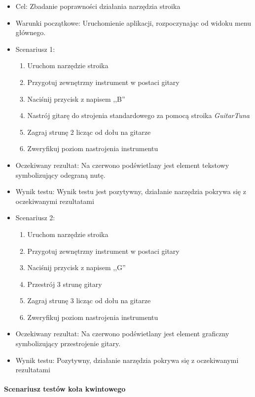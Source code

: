 \begin{itemize}
    \item Cel: Zbadanie poprawności działania narzędzia stroika
    \item Warunki początkowe: Uruchomienie aplikacji, rozpoczynając od widoku menu głównego. 
    \item Scenariusz 1:
        \begin{enumerate}
            \item Uruchom narzędzie stroika
            \item Przygotuj zewnętrzny instrument w postaci gitary
            \item Naciśnij przycisk z napisem ,,B''
            \item Nastrój gitarę do strojenia standardowego za pomocą stroika \emph{GuitarTuna}
            \item Zagraj strunę 2 licząc od dołu na gitarze
            \item Zweryfikuj poziom nastrojenia instrumentu
        \end{enumerate}
    \item Oczekiwany rezultat: Na czerwono podświetlany jest element tekstowy symbolizujący odegraną nutę.
    \item Wynik testu: Wynik testu jest pozytywny, działanie narzędzia pokrywa się z oczekiwanymi rezultatami
    \item Scenariusz 2:
        \begin{enumerate}
            \item Uruchom narzędzie stroika
            \item Przygotuj zewnętrzny instrument w postaci gitary
            \item Naciśnij przycisk z napisem ,,G''
            \item Przestrój 3 strunę gitary
            \item Zagraj strunę 3 licząc od dołu na gitarze
            \item Zweryfikuj poziom nastrojenia instrumentu
        \end{enumerate}
    \item Oczekiwany rezultat: Na czerwono podświetlany jest element graficzny symbolizujący przestrojenie gitary.
    \item Wynik testu: Pozytywny, działanie narzędzia pokrywa się z oczekiwanymi rezultatami
\end{itemize}

\paragraph{Scenariusz testów koła kwintowego}

